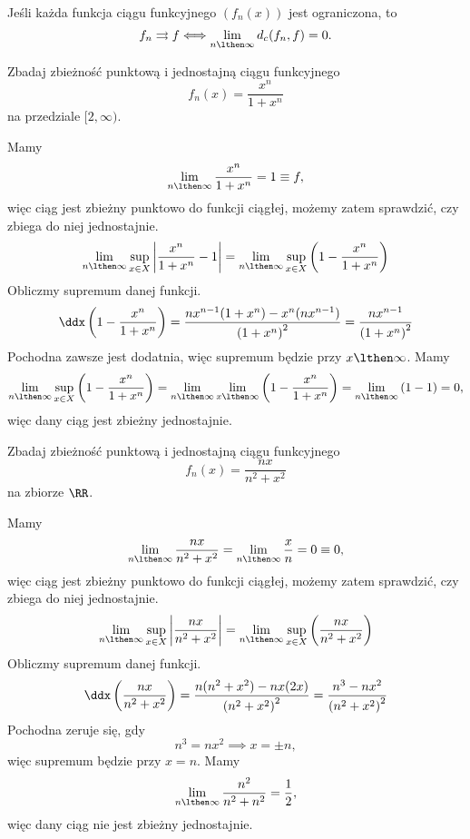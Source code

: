 \begin{theorem}
    Jeśli każda funkcja ciągu funkcyjnego $(f_n(x))$ jest ograniczona, to
    \[ f_n \rightrightarrows f \Longleftrightarrow \lim_{n\lthen\infty}d_c(f_n, f) = 0 .\]
\end{theorem}

\begin{example}
    Zbadaj zbieżność punktową i jednostajną ciągu funkcyjnego
    \[ f_n(x) = \frac{x^n}{1 + x^n} \]
    na przedziale $[2, \infty)$.
\end{example}
\begin{solution}
    Mamy
    \[ \lim_{n\lthen\infty} \frac{x^n}{1 + x^n} = 1 \equiv f, \]
    więc ciąg jest zbieżny punktowo do funkcji ciągłej, możemy zatem sprawdzić, czy zbiega do niej jednostajnie.
    \[ \lim_{n\lthen\infty}\sup_{x\in X} \left|\frac{x^n}{1 + x^n} - 1\right| = \lim_{n\lthen\infty}\sup_{x\in X} \left(1 - \frac{x^n}{1 + x^n}\right)\]
    Obliczmy supremum danej funkcji.
    \[ \ddx \left(1 - \frac{x^n}{1 + x^n}\right) = \frac{nx^{n-1}(1 + x^n) - x^n(nx^{n-1})}{\left(1 + x^n\right)^2} = \frac{nx^{n-1}}{\left(1 + x^n\right)^2} \]
    Pochodna zawsze jest dodatnia, więc supremum będzie przy $x \lthen \infty$. Mamy
    \[ \lim_{n\lthen\infty}\sup_{x\in X} \left(1 - \frac{x^n}{1 + x^n}\right) = \lim_{n\lthen\infty}\lim_{x\lthen\infty} \left(1 - \frac{x^n}{1 + x^n}\right) = \lim_{n\lthen\infty} \left(1 - 1\right) = 0, \]
    więc dany ciąg jest zbieżny jednostajnie.
\end{solution}

\begin{example}
    Zbadaj zbieżność punktową i jednostajną ciągu funkcyjnego
    \[ f_n(x) = \frac{nx}{n^2 + x^2} \]
    na zbiorze $\RR$.
\end{example}
\begin{solution}
    Mamy
    \[ \lim_{n\lthen\infty} \frac{nx}{n^2 + x^2} = \lim_{n\lthen\infty} \frac{x}{n} = 0 \equiv 0, \]
    więc ciąg jest zbieżny punktowo do funkcji ciągłej, możemy zatem sprawdzić, czy zbiega do niej jednostajnie.
    \[ \lim_{n\lthen\infty}\sup_{x\in X} \left|\frac{nx}{n^2 + x^2}\right| = \lim_{n\lthen\infty}\sup_{x\in X} \left(\frac{nx}{n^2 + x^2}\right) \]
    Obliczmy supremum danej funkcji.
    \[ \ddx \left(\frac{nx}{n^2 + x^2}\right) = \frac{n(n^2 + x^2) - nx(2x)}{\left(n^2 + x^2\right)^2} = \frac{n^3 - nx^2}{\left(n^2 + x^2\right)^2} \]
    Pochodna zeruje się, gdy
    \[ n^3 = nx^2 \implies x = \pm n, \]
    więc supremum będzie przy $x = n$. Mamy
    \[ \lim_{n\lthen\infty}\frac{n^2}{n^2 + n^2} = \frac{1}{2}, \]
    więc dany ciąg nie jest zbieżny jednostajnie.
\end{solution}

